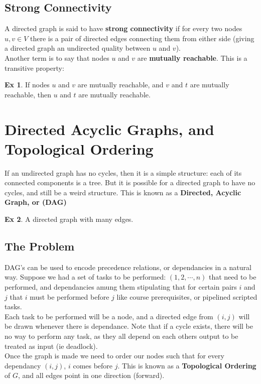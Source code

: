 \documentclass{report}
\theoremstyle{definition}
\newtheorem*{examp}{Ex}
\begin{document}
		\subsection{Strong Connectivity}
			A directed graph is said to have \textbf{strong connectivity} if for every two nodes $u, v \in V$ there is a pair of
			directed edges connecting them from either side (giving a directed graph an undirected quality between $u$ and $v$).\\
			
			Another term is to say that nodes $u$ and $v$ are \textbf{mutually reachable}. This is a transitive property:
			\begin{examp}
				If nodes $u$ and $v$ are mutually reachable, and $v$ and $t$ are mutually reachable, then $u$ and $t$ are
				mutually reachable.
			\end{examp}
	\section{Directed Acyclic Graphs, and Topological Ordering}
		If an undirected graph has no cycles, then it is a simple structure: each of its connected components is a tree. But it is
		possible for a directed graph to have no cycles, and still be a weird structure. This is known as a 
		\textbf{Directed, Acyclic Graph, or (DAG)}
		\begin{examp}
			A directed graph with many edges.
		\end{examp}
		\subsection{The Problem}
			DAG's can be used to encode precedence relations, or dependancies in a natural way. Suppose we had a set of tasks
			to be performed: $(1, 2, \cdots, n)$ that need to be performed, and dependancies amung them stipulating that for 
			certain pairs $i$ and $j$ that $i$ must be performed before $j$ like course prerequisites, or pipelined scripted tasks.\\

			Each task to be performed will be a node, and a directed edge from $(i, j)$ will be drawn whenever there is
			dependance. Note that if a cycle exists, there will be no way to perform any task, as they all depend on each 
			others output to be treated as input (ie deadlock).\\

			Once the graph is made we need to order our nodes such that for every dependancy $(i, j)$, $i$ comes before $j$.
			This is known as a \textbf{Topological Ordering} of $G$, and all edges point in one direction (forward).
			
\end{document}
